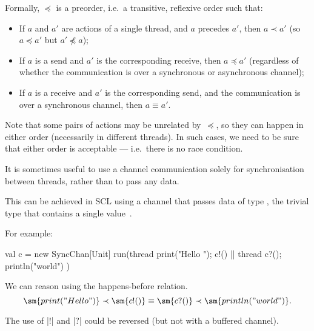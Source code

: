 \documentclass[notes,color]{sepslide0}
\begin{document}

\begin{slide}

Formally, $\preceq$ is a preorder, i.e.~a transitive, reflexive order such
that:
%
\begin{itemize}
\item
If $a$ and $a'$ are actions of a single thread, and $a$ precedes $a'$, then $a
\prec a'$ (so $a \preceq a'$ but $a' \not\preceq a$);

\item
If $a$ is a send and $a'$ is the corresponding receive, then $a \preceq a'$
(regardless of whether the communication is over a synchronous or asynchronous
channel);  

\item
If $a$ is a receive and $a'$ is the corresponding send, and the communication
is over a synchronous channel, then $a \equiv a'$.
\end{itemize}

Note that some pairs of actions may be unrelated by~$\preceq$, so they can
happen in either order (necessarily in different threads).  In such cases, we
need to be sure that either order is acceptable --- i.e.~there is no race
condition. 
\end{slide}


\begin{slide}

It is sometimes useful to use a channel communication solely for
synchronisation between threads, rather than to pass any data.

This can be achieved in SCL using a channel that passes data of type
, the trivial type that contains a single value~\SCALA{()}.  

For example:
\begin{scala}
val c = new SyncChan[Unit]
run(thread{ print("Hello "); c!() } || thread{ c?(); println("world") })
\end{scala}

We can reason using the happens-before relation.
\[
\sm{print("Hello")} \prec \sm{c!()} \equiv \sm{c?()} \prec \sm{println("world")}.
\]

The use of |!| and |?| could be reversed (but not with a buffered channel).

\end{slide}
\end{document}
